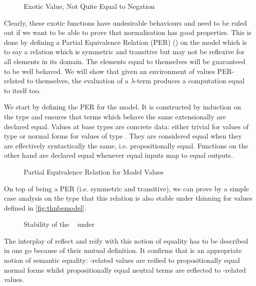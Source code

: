 \begin{figure}[h]
\caption{Exotic Value, Not Quite Equal to Negation\label{fig:nbeexotic}}
\end{figure}

Clearly, these exotic functions have undesirable behaviours and need to be ruled out
if we want to be able to prove that normalisation has good properties. This is done
by defining a Partial Equivalence Relation (PER) (\cite{mitchell1996foundations})
on the model which is to say a relation which is symmetric and transitive but may
not be reflexive for all elements in its domain. The elements equal to themselves will be
guaranteed to be well behaved. We will show that given an environment of values
PER-related to themselves, the evaluation of a $λ$-term produces a computation
equal to itself too.


We start by defining the PER for the model. It is constructed by induction on the type
and ensures that terms which behave the same extensionally are declared equal. Values at
base types are concrete data: either trivial for values of type  or normal
forms for values of type . They are considered equal when they are effectively
syntactically the same, i.e. propositionally equal. Functions on the other hand are
declared equal whenever equal inputs map to equal outputs.

\begin{figure}[h]
\caption{Partial Equivalence Relation for Model Values\label{fig:nbeper}}
\end{figure}

On top of being a PER (i.e. symmetric and transitive), we can prove by a simple case
analysis on the type that this relation is also stable under thinning for 
values defined in \cref{fig:thnbemodel}.

\begin{figure}[h]
\caption{Stability of the ~ under \label{fig:nbeperth}}
\end{figure}

The interplay of reflect and reify with this notion of equality has to be described
in one go because of their mutual definition. It confirms that  is an appropriate
notion of semantic equality: -related values are reified to propositionally
equal normal forms whilst propositionally equal neutral terms are reflected
to -related values.

